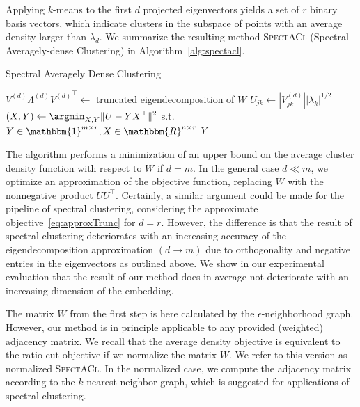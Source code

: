 Applying $k$-means to the first $d$ projected eigenvectors yields a set of $r$ binary basis vectors, which indicate clusters in the subspace of points with an average density larger than $\lambda_d$. We summarize the resulting method \textsc{SpectACl} (Spectral Averagely-dense Clustering) in Algorithm~\ref{alg:spectacl}.
\begin{algorithm}[t]
\caption{Spectral Averagely Dense Clustering} 
\begin{algorithmic}[1]
   
  \State $V^{(d)}\Lambda^{(d)}{V^{(d)}}^\top\gets$ truncated eigendecomposition of $W$ \label{alg:spectacl:truncEig}
  \State $U_{jk}\gets|V_{jk}^{(d)}||\lambda_k|^{1/2}$ 
  \State $\displaystyle (X,Y)\gets \argmin_{X,Y}\|U-YX^\top\|^2$ s.t. $Y\in\mathbbm{1}^{m\times r}, X\in\mathbbm{R}^{n\times r}$ 
  \State \Return $Y$
  \EndFunction
\end{algorithmic}
\label{alg:spectacl}
\end{algorithm}
The algorithm performs a minimization of an upper bound on the average cluster density function with respect to $W$ if $d=m$. In the general case $d\ll m$, we optimize an approximation of the objective function, replacing $W$ with the nonnegative product $UU^\top$. Certainly, a similar argument could be made for the pipeline of spectral clustering, considering the approximate objective~\eqref{eq:approxTrunc} for $d=r$. However, the difference is that the result of spectral clustering deteriorates with an increasing accuracy of the eigendecomposition approximation $(d\rightarrow m)$ due to orthogonality and negative entries in the eigenvectors as outlined above. We show in our experimental evaluation that the result of our method does in average not deteriorate with an increasing dimension of the embedding.

The matrix $W$ from the first step is here calculated by the $\epsilon$-neighborhood graph. However, our method is in principle applicable to any provided (weighted) adjacency matrix. We recall that the average density objective is equivalent to the ratio cut objective if we normalize the matrix $W$. We refer to this version as normalized \textsc{SpectACl}. In the normalized case, we compute the adjacency matrix according to the $k$-nearest neighbor graph, which is suggested for applications of spectral clustering.

